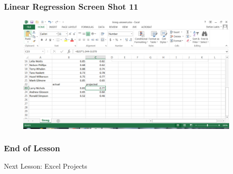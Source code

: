\documentclass[xcolor=dvipsnames]{beamer}
\begin{document}
\begin{frame}
  \frametitle{Linear Regression Screen Shot 11}
  \begin{figure}[h]
    \includegraphics[scale=.42]{./linreg13.png}
  \end{figure}
\end{frame}

\begin{frame}
  \frametitle{End of Lesson}
Next Lesson: Excel Projects
\end{frame}
\end{document}
